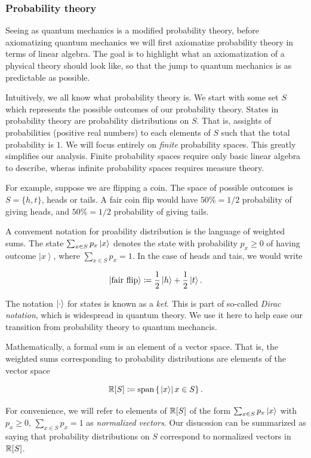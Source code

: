 \documentclass{article}
\theoremstyle{definition}
\numberwithin{figure}{section}
\begin{document}
\subsubsection{Probability theory}

Seeing as quantum mechanics is a modified probability theory, before axiomatizing quantum mechanics we will first axiomatize probability theory in terms of linear algebra. The goal is to highlight what an axiomatization of a physical theory should look like, so that the jump to quantum mechanics is as predictable as possible.

Intuitively, we all know what probability theory is. We start with some set $S$ which represents the possible outcomes of our probability theory. States in probability theory are probability distributions on $S$. That is, assights of probabilities (positive real numbers) to each elements of $S$ such that the total probability is $1$. We will focus entirely on \textit{finite} probability spaces. This greatly simplifies our analysis. Finite probability spaces require only basic linear algebra to describe, wheras infinite probability spaces requires measure theory.

For example, suppose we are flipping a coin. The space of possible outcomes is $S=\{h,t\}$, heads or tails. A fair coin flip would have $50\%=1/2$ probability of giving heads, and $50\%=1/2$ probability of giving tails.

A convement notation for proability distribution is the language of weighted sums. The state $\sum_{x\in S}p_x\ket{x}$ denotes the state with probability $p_x\geq 0$ of having outcome $\left| x\right>$, where $\sum_{x\in S}p_x=1$. In the case of heads and tais, we would write

$$\ket{\text{fair flip}}\coloneqq\frac{1}{2}\ket{h}+\frac{1}{2}\ket{t}.$$

The notation $\ket{\cdot}$ for states is known as a \textit{ket}. This is part of so-called \textit{Dirac notation}, which is widespread in quantum theory. We use it here to help ease our transition from probability theory to quantum mechancis.

Mathematically, a formal sum is an element of a vector space. That is, the weighted sums corresponding to probability distributions are elements of the vector space

$$\mathbb{R}[S]\coloneqq \text{span} \left\{\left.\ket{x}\right| x\in S\right\}.$$

For convenience, we will refer to elements of $\mathbb{R}[S]$ of the form $\sum_{x\in S}p_x \ket{x}$ with $p_x\geq 0$, $\sum_{x\in S}p_x=1$ as \textit{normalized vectors}. Our disucssion can be summarized as saying that probability distributions on $S$ correspond to normalized vectors in $\mathbb{R}[S]$.
\end{document}
